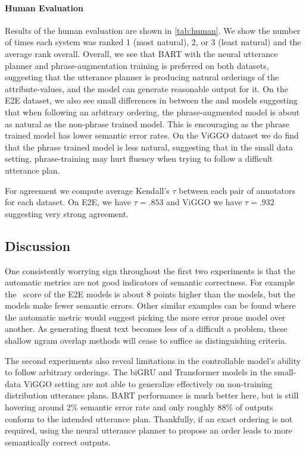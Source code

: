 

\paragraph{Human Evaluation} Results of the human evaluation are shown in
\autoref{tab:human}. We show the number of times each system was ranked 1 (most
natural), 2, or 3 (least natural) and the average rank overall.  Overall, we
see that BART  with the neural utterance planner and phrase-augmentation
training is preferred on both datasets, suggesting that the utterance planner
is producing natural orderings of the attribute-values, and the model can
generate reasonable output for it. On the E2E dataset, we also see small
differences in between the  and  models suggesting
that when following an arbitrary ordering, the phrase-augmented model is about
as natural as the non-phrase trained model. This is encouraging as the phrase
trained model has lower semantic error rates.  On the ViGGO dataset we do find
that the phrase trained model is less natural, suggesting that in the small
data setting, phrase-training may hurt fluency when trying to follow a
difficult utterance plan.

For agreement we compute average Kendall's $\tau$ between each pair of
annotators for each dataset. On E2E, we have $\tau=.853$ and ViGGO we have
$\tau=.932$ suggesting very strong agreement.

\subsection{Discussion}

One consistently worrying sign throughout the first two experiments is that the
automatic metrics are not good indicators of semantic correctness.  For example
the \rougel~score of the E2E  models is about 8 points
higher than the  models, but the  models make
fewer semantic errors. Other similar examples can be found where the automatic
metric would suggest picking the more error prone model over another. As
generating fluent text becomes less of a difficult a problem, these shallow
ngram overlap methods will cease to suffice as distinguishing criteria.

The second experiments also reveal limitations in the controllable model's
ability to follow arbitrary orderings. The biGRU and Transformer models in the
small-data ViGGO setting are not able to generalize effectively on non-training
distribution utterance plans. BART performance is much better here, but is
still hovering around 2\% semantic error rate and only roughly 88\% of outputs
conform to the intended utterance plan.  Thankfully, if an exact ordering is
not required, using the neural utterance planner to propose an order leads to
more semantically correct outputs.

